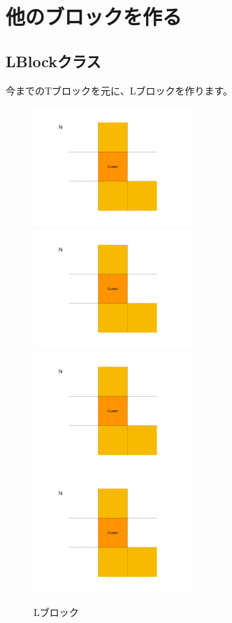 \chapter{他のブロックを作る}
\section{LBlockクラス}
今までのTブロックを元に、Lブロックを作ります。
\begin{figure}[h]
  \includegraphics[width=60mm, page=1]{images/LBlock.pdf}
  \includegraphics[width=60mm, page=2]{images/LBlock.pdf}
  \includegraphics[width=60mm, page=3]{images/LBlock.pdf}
  \includegraphics[width=60mm, page=4]{images/LBlock.pdf}
  \caption{Lブロック}
\end{figure}
